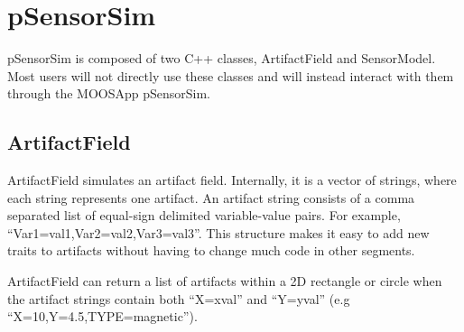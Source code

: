 \section{pSensorSim}
\label{pSensorSim}

pSensorSim is composed of two C++ classes, ArtifactField and SensorModel.  Most users will not directly use these classes and will instead interact with them through the MOOSApp pSensorSim.

\subsection{ArtifactField}
\label{classArtifactField}
ArtifactField simulates an artifact field.  Internally, it is a vector of strings, where each string represents one artifact.  An artifact string consists of a comma separated list of equal-sign delimited variable-value pairs.  For example, ``Var1=val1,Var2=val2,Var3=val3''.  This structure makes it easy to add new traits to artifacts without having to change much code in other segments.

ArtifactField can return a list of artifacts within a 2D rectangle or circle when the artifact strings contain both ``X=xval'' and ``Y=yval'' (e.g ``X=10,Y=4.5,TYPE=magnetic'').

